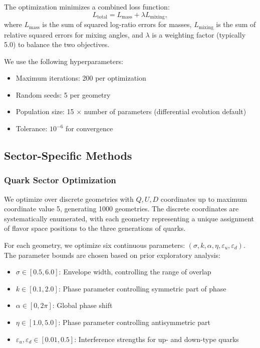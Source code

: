 \documentclass[12pt,a4paper]{article}
\begin{document}
The optimization minimizes a combined loss function:
\begin{equation}
L_{\text{total}} = L_{\text{mass}} + \lambda L_{\text{mixing}},
\end{equation}
where $L_{\text{mass}}$ is the sum of squared log-ratio errors for masses, $L_{\text{mixing}}$ is the sum of relative squared errors for mixing angles, and $\lambda$ is a weighting factor (typically 5.0) to balance the two objectives.

We use the following hyperparameters:
\begin{itemize}
\item Maximum iterations: 200 per optimization
\item Random seeds: 5 per geometry
\item Population size: 15 $\times$ number of parameters (differential evolution default)
\item Tolerance: $10^{-6}$ for convergence
\end{itemize}

\subsection{Sector-Specific Methods}

\subsubsection{Quark Sector Optimization}

We optimize over discrete geometries with $Q, U, D$ coordinates up to maximum coordinate value 5, generating 1000 geometries. The discrete coordinates are systematically enumerated, with each geometry representing a unique assignment of flavor space positions to the three generations of quarks.

For each geometry, we optimize six continuous parameters: $(\sigma, k, \alpha, \eta, \varepsilon_u, \varepsilon_d)$. The parameter bounds are chosen based on prior exploratory analysis:
\begin{itemize}
\item $\sigma \in [0.5, 6.0]$: Envelope width, controlling the range of overlap
\item $k \in [0.1, 2.0]$: Phase parameter controlling symmetric part of phase
\item $\alpha \in [0, 2\pi]$: Global phase shift
\item $\eta \in [1.0, 5.0]$: Phase parameter controlling antisymmetric part
\item $\varepsilon_u, \varepsilon_d \in [0.01, 0.5]$: Interference strengths for up- and down-type quarks
\end{itemize}
\end{document}
